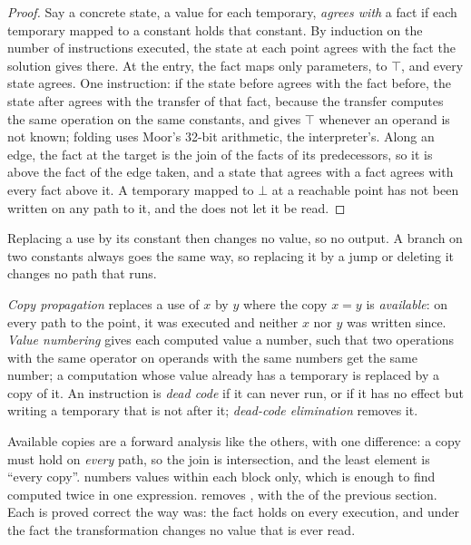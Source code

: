 \begin{proof}
Say a concrete state, a value for each temporary, \emph{agrees with} a fact if each temporary mapped to a constant holds that constant. By induction on the number of instructions executed, the state at each point agrees with the fact the solution gives there. At the entry, the fact maps only parameters, to $\top$, and every state agrees. One instruction: if the state before agrees with the fact before, the state after agrees with the transfer of that fact, because the transfer computes the same operation on the same constants, and gives $\top$ whenever an operand is not known; folding uses Moor's 32-bit arithmetic, the interpreter's. Along an edge, the fact at the target is the join of the facts of its predecessors, so it is above the fact of the edge taken, and a state that agrees with a fact agrees with every fact above it. A temporary mapped to $\bot$ at a reachable point has not been written on any path to it, and the  does not let it be read.
\end{proof}

Replacing a use by its constant then changes no value, so no output. A branch on two constants always goes the same way, so replacing it by a jump or deleting it changes no path that runs.

\begin{definition}\label{def:b3:program-optimisation:others}
\emph{Copy propagation} replaces a use of $x$ by $y$ where the copy $x = y$ is \emph{available}: on every path to the point, it was executed and neither $x$ nor $y$ was written since. \emph{Value numbering} gives each computed value a number, such that two operations with the same operator on operands with the same numbers get the same number; a computation whose value already has a temporary is replaced by a copy of it. An instruction is \emph{dead code} if it can never run, or if it has no effect but writing a temporary that is not  after it; \emph{dead-code elimination} removes it.
\end{definition}

Available copies are a forward analysis like the others, with one difference: a copy must hold on \emph{every} path, so the join is intersection, and the least element is ``every copy''.  numbers values within each block only, which is enough to find  computed twice in one expression.  removes , with the  of the previous section. Each is proved correct the way  was: the fact holds on every execution, and under the fact the transformation changes no value that is ever read.

